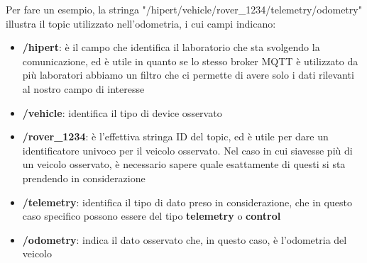 \noindent Per fare un esempio, la stringa "/hipert/vehicle/rover\_1234/telemetry/odometry" illustra il topic utilizzato nell'odometria, i cui campi indicano:

\begin{itemize}
  \item \textbf{/hipert}: è il campo che identifica il laboratorio che sta svolgendo la comunicazione, ed è utile in quanto se lo stesso broker MQTT è utilizzato da più laboratori abbiamo un filtro che ci permette di avere solo i dati rilevanti al nostro campo di interesse
  \item \textbf{/vehicle}: identifica il tipo di device osservato
  \item \textbf{/rover\_1234}: è l'effettiva stringa ID del topic, ed è utile per dare un identificatore univoco per il veicolo osservato. Nel caso in cui siavesse più di un veicolo osservato, è necessario sapere quale esattamente di questi si sta prendendo in considerazione
  \item \textbf{/telemetry}: identifica il tipo di dato preso in considerazione, che in questo caso specifico possono essere del tipo \textbf{telemetry} o \textbf{control}
  \item \textbf{/odometry}: indica il dato osservato che, in questo caso, è l'odometria del veicolo
\end{itemize}
